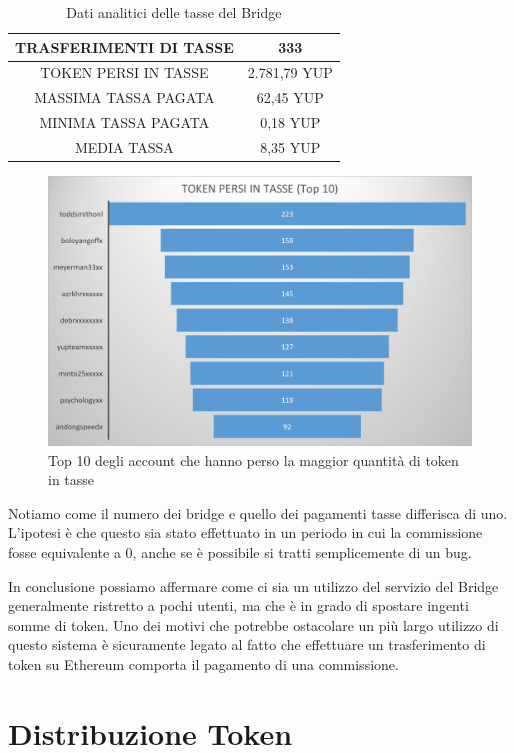 \begin{table}[h!]
\centering
\begin{tabular}{ |c|c|}
 \hline
 TRASFERIMENTI DI TASSE & 333 \\
 \hline
 TOKEN PERSI IN TASSE & 2.781,79 YUP \\
 \hline
 MASSIMA TASSA PAGATA & 62,45 YUP \\
 \hline
 MINIMA TASSA PAGATA & 0,18 YUP \\
 \hline
 MEDIA TASSA & 8,35 YUP \\
 \hline
\end{tabular}
\caption{Dati analitici delle tasse del Bridge}
\label{tab: fees_analytics}
\end{table}

\begin{figure}[t]
    \centering
    \includegraphics[width=.7\textwidth]{graphs/top10_fees.png}
    \caption{Top 10 degli account che hanno perso la maggior quantità di token in tasse}
    \label{fig: top10_fees}
\end{figure}

Notiamo come il numero dei bridge e quello dei pagamenti tasse differisca di uno. L'ipotesi è che questo sia stato effettuato in un periodo in cui la commissione fosse equivalente a 0, anche se è possibile si tratti semplicemente di un bug.

In conclusione possiamo affermare come ci sia un utilizzo del servizio del Bridge generalmente ristretto a pochi utenti, ma che è in grado di spostare ingenti somme di token.
Uno dei motivi che potrebbe ostacolare un più largo utilizzo di questo sistema è sicuramente legato al fatto che effettuare un trasferimento di token su Ethereum comporta il pagamento di una commissione. 

\section{Distribuzione Token}

